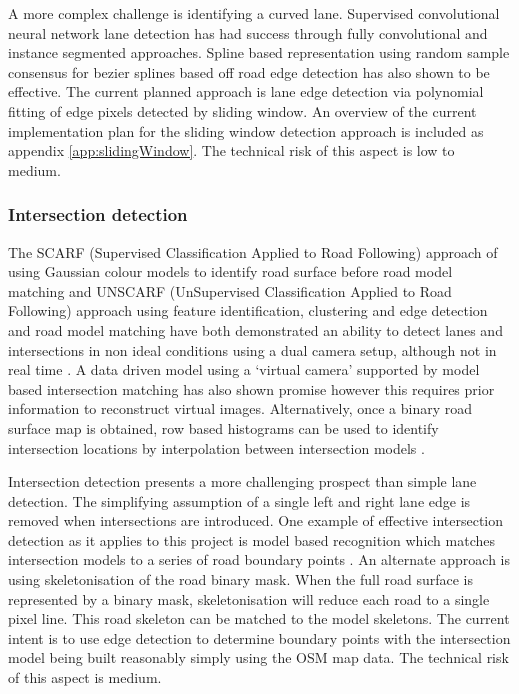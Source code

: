 \documentclass[]{aiaa-tc}%
\begin{document}
A more complex challenge is identifying a curved lane. Supervised convolutional neural network lane detection has had success through fully convolutional \citep{cnnLanes1} and instance segmented \citep{cnnLanes2} approaches. Spline based representation using random sample consensus for bezier splines based off road edge detection \citep{ransicBezierFit} has also shown to be effective. The current planned approach is lane edge detection via polynomial fitting of edge pixels detected by sliding window. An overview of the current implementation plan for the sliding window detection approach is included as appendix \ref{app:slidingWindow}. The technical risk of this aspect is low to medium.


\subsubsection{Intersection detection}

The SCARF (Supervised Classification Applied to Road Following) approach of using Gaussian colour models to identify road surface before road model matching \citep{scarf} and UNSCARF (UnSupervised Classification Applied to Road Following) approach using feature identification, clustering and edge detection and road model matching \citep{unscarf} have both demonstrated an ability to detect lanes and intersections in non ideal conditions using a dual camera setup, although not in real time \citep{scarfAndUnscarfPresented}. A data driven model using a `virtual camera' supported by model based intersection matching has also shown promise \citep{alvinnVC} however this requires prior information to reconstruct virtual images. Alternatively, once a binary road surface map is obtained, row based histograms can be used to identify intersection locations by interpolation between intersection models \citep{intersectionDetectionSingleCamera}.

Intersection detection presents a more challenging prospect than simple lane detection. The simplifying assumption of a single left and right lane edge is removed when intersections are introduced. One example of effective intersection detection as it applies to this project is model based recognition which matches intersection models to a series of road boundary points \citep{modelBasedIntersection}. An alternate approach is using skeletonisation of the road binary mask. When the full road surface is represented by a binary mask, skeletonisation will reduce each road to a single pixel line. This road skeleton can be matched to the model skeletons. The current intent is to use edge detection to determine boundary points with the intersection model being built reasonably simply using the OSM map data. The technical risk of this aspect is medium.
\end{document}
